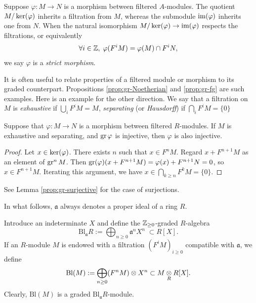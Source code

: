 \begin{remark}
	Suppose $\varphi: M \to N$ is a morphism between filtered $A$-modules. The quotient $M/\operatorname{ker}(\varphi)$ inherits a filtration from $M$, whereas the submodule $\operatorname{im}(\varphi)$ inherits one from $N$. When the natural isomorphism $M/\operatorname{ker}(\varphi) \to \operatorname{im}(\varphi)$ respects the filtrations, or equivalently
	\[ \forall i \in \mathbb{Z}, \; \varphi(F^i M) = \varphi(M) \cap F^i N, \]
	we say $\varphi$ is a \emph{strict morphism}.
\end{remark}

It is often useful to relate properties of a filtered module or morphism to its graded counterpart. Propositions \ref{prop:gr-Noetherian} and \ref{prop:gr-fg} are such examples. Here is an example for the other direction. We say that a filtration on $M$ is \emph{exhaustive} if $\bigcup_i F^i M = M$, \emph{separating} (or \emph{Hausdorff}) if $\bigcap_i F^i M = \{0\}$

\begin{proposition}\label{prop:gr-injective}
	Suppose that $\varphi: M \to N$ is a morphism between filtered $R$-modules. If $M$ is exhaustive and separating, and $\operatorname{gr}\varphi$ is injective, then $\varphi$ is also injective.
\end{proposition}
\begin{proof}
	Let $x \in \operatorname{ker}(\varphi)$. There exists $n$ such that $x \in F^n M$. Regard $x + F^{n+1} M$ as an element of $\operatorname{gr}^n M$. Then $\operatorname{gr}(\varphi)(x + F^{n+1} M) = \varphi(x) + F^{n+1} N = 0$, so $x \in F^{n+1} M$. Iterating this argument, we have $x \in \bigcap_{k \geq n} F^k M = \{0\}$.
\end{proof}
See Lemma \ref{prop:gr-surjective} for the case of surjections.

In what follows, $\mathfrak{a}$ always denotes a proper ideal of a ring $R$.

\begin{definition}
	Introduce an indeterminate $X$ and define the $\mathbb{Z}_{\geq 0}$-graded $R$-algebra
	\[ \text{Bl}_{\mathfrak{a}} R := \bigoplus_{n \geq 0} \mathfrak{a}^n X^n \; \subset R[X]. \]
	If an $R$-module $M$ is endowed with a filtration $(F^i M)_{i \geq 0}$ compatible with $\mathfrak{a}$, we define
	\[ \text{Bl}(M) := \bigoplus_{n \geq 0} (F^n M) \otimes X^n \subset M \underset{R}{\otimes} R[X]. \]
	Clearly, $\text{Bl}(M)$ is a graded $\text{Bl}_{\mathfrak{a}} R$-module.
\end{definition}

